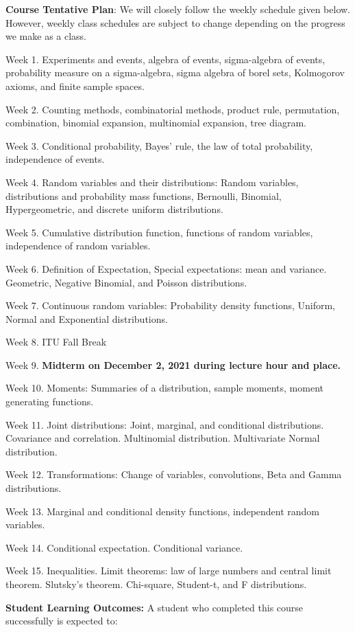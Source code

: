 \documentclass[
  12pt,
]{article}
\begin{document}
\textbf{Course Tentative Plan}: We will closely follow the weekly
schedule given below. However, weekly class schedules are subject to
change depending on the progress we make as a class.

Week 1. Experiments and events, algebra of events, sigma-algebra of
events, probability measure on a sigma-algebra, sigma algebra of borel
sets, Kolmogorov axioms, and finite sample spaces.

Week 2. Counting methods, combinatorial methods, product rule,
permutation, combination, binomial expansion, multinomial expansion,
tree diagram.

Week 3. Conditional probability, Bayes' rule, the law of total
probability, independence of events.

Week 4. Random variables and their distributions: Random variables,
distributions and probability mass functions, Bernoulli, Binomial,
Hypergeometric, and discrete uniform distributions.

Week 5. Cumulative distribution function, functions of random variables,
independence of random variables.

Week 6. Definition of Expectation, Special expectations: mean and
variance. Geometric, Negative Binomial, and Poisson distributions.

Week 7. Continuous random variables: Probability density functions,
Uniform, Normal and Exponential distributions.

Week 8. ITU Fall Break

Week 9. \textbf{Midterm on December 2, 2021 during lecture hour and
place.}

Week 10. Moments: Summaries of a distribution, sample moments, moment
generating functions.

Week 11. Joint distributions: Joint, marginal, and conditional
distributions. Covariance and correlation. Multinomial distribution.
Multivariate Normal distribution.

Week 12. Transformations: Change of variables, convolutions, Beta and
Gamma distributions.

Week 13. Marginal and conditional density functions, independent random
variables.

Week 14. Conditional expectation. Conditional variance.

Week 15. Inequalities. Limit theorems: law of large numbers and central
limit theorem. Slutsky's theorem. Chi-square, Student-t, and F
distributions.

\textbf{Student Learning Outcomes:} A student who completed this course
successfully is expected to:
\end{document}
